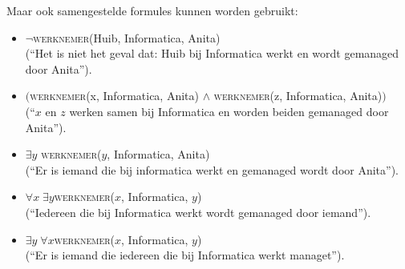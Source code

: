 Maar ook samengestelde formules kunnen worden gebruikt:
\begin{itemize}
\item $\neg$\textsc{werknemer}(Huib, Informatica, Anita)\\(``Het is niet het geval dat: Huib bij Informatica werkt en wordt gemanaged door Anita'').
\item $($\textsc{werknemer}(x, Informatica, Anita) $\wedge$ \textsc{werknemer}(z, Informatica, Anita)$)$\\(``$x$ en $z$ werken samen bij Informatica en worden beiden gemanaged door Anita'').
\item $\exists y$ \textsc{werknemer}($y$, Informatica, Anita)\\(``Er is iemand die bij informatica werkt en gemanaged wordt door Anita'').
\item $\forall x\;\exists y$\textsc{werknemer}($x$, Informatica, $y$)\\(``Iedereen die bij Informatica werkt wordt gemanaged door iemand'').
\item $\exists y\;\forall x$\textsc{werknemer}($x$, Informatica, $y$)\\(``Er is iemand die iedereen die bij Informatica werkt managet'').
\end{itemize}

